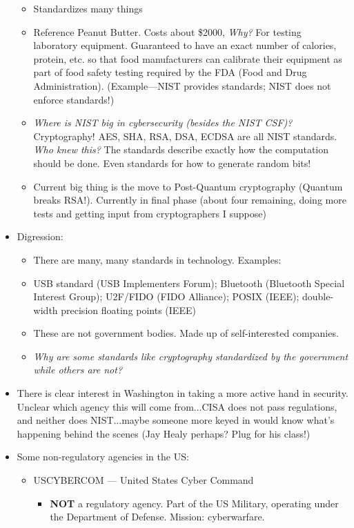 \documentclass[11pt]{article}
\begin{document}
\begin{itemize}
\begin{itemize}
        \item Standardizes many things 
        \item Reference Peanut Butter. Costs about \$2000, {\it Why?} For testing laboratory equipment. Guaranteed to have an exact number of calories, protein, etc. so that food manufacturers can calibrate their equipment as part of food safety testing required by the FDA (Food and Drug Administration). (Example---NIST provides standards; NIST does not enforce standards!)
        \item {\it Where is NIST big in cybersecurity (besides the NIST CSF)?} Cryptography! AES, SHA, RSA, DSA, ECDSA are all NIST standards. {\it Who knew this?} The standards describe exactly how the computation should be done. Even standards for how to generate random bits!
        \item Current big thing is the move to Post-Quantum cryptography (Quantum breaks RSA!). Currently in final phase (about four remaining, doing more tests and getting input from cryptographers I suppose)
    \end{itemize}
    \item Digression:
    \begin{itemize}
        \item There are many, many standards in technology. Examples:
        \item USB standard (USB Implementers Forum); Bluetooth (Bluetooth Special Interest Group); U2F/FIDO (FIDO Alliance); POSIX (IEEE); double-width precision floating points (IEEE)
        \item These are not government bodies. Made up of self-interested companies.
        \item {\it Why are some standards like cryptography standardized by the government while others are not?}
    \end{itemize}
    \item There is clear interest in Washington in taking a more active hand in security. Unclear which agency this will come from...CISA does not pass regulations, and neither does NIST...maybe someone more keyed in would know what's happening behind the scenes (Jay Healy perhaps? Plug for his class!)
    \item Some non-regulatory agencies in the US:
    \begin{itemize}
        \item USCYBERCOM --- United States Cyber Command
        \begin{itemize}
            \item {\bf NOT} a regulatory agency. Part of the US Military, operating under the Department of Defense. Mission: cyberwarfare.

\end{itemize}
\end{itemize}
\end{itemize}
\end{document}

